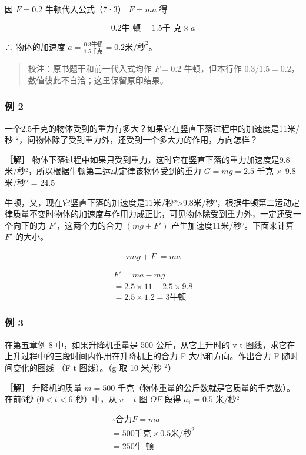 因 \(F = 0.2\) 牛顿代入公式（7·3） \(F=ma\) 得

\[
0.2 \text{牛 顿} = 1.5 \text{千 克} \times a
\]

∴ 物体的加速度
\(a=\frac{0.3\text{牛顿}}{1.5\text{千克}}=0.2\text{米/秒}^{2}\)。

\begin{quote}
校注：原书题干和前一代入式均作 \(F=0.2\) 牛顿，但本行作
\(0.3/1.5=0.2\)，数值彼此不自洽；这里保留原印结果。
\end{quote}

\subsubsection{例 2}\label{ux4f8b-2-7}

一个2.5千克的物体受到的重力有多大？如果它在竖直下落过程中的加速度是11米/秒
\(^{2}\)，问物体除了受到重力外，还受到一个多大力的作用，方向怎样？

\textbf{［解］}
物体下落过程中如果只受到重力，这时它在竖直下落的重力加速度是9.8米/秒²，所以根据牛顿第二运动定律该物体受到的重力
\(G = mg = 2.5\) 千克 × 9.8 米/秒² = 24.5

牛顿，又，现在它竖直下落的加速度是11米/秒²\textgreater9.8米/秒²，根据牛顿第二运动定律质量不变时物体的加速度与作用力成正比，可见物体除受到重力外，一定还受一个向下的力
\(F'\)，这两个力的合力 \((mg+F')\) 产生加速度11米/秒²。下面来计算 \(F'\)
的大小。

\[
\because m g + F ^ {\prime} = m a
\]

\[
\begin{array}{l} F'=ma-mg\\ =2.5\times11-2.5\times9.8\\ =2.5\times1.2=3\text{牛顿} \end{array}
\]

\subsubsection{例 3}\label{ux4f8b-3-5}

在第五章例 8 中，如果升降机重量是 500 公斤，从它上升时的 v-t
图线，求它在上升过程中的三段时间内作用在升降机上的合力 F
大小和方向。作出合力 F 随时间变化的图线 （F-t 图线）。（g 取 10 米/秒
\(^{2}\)）

\textbf{［解］} 升降机的质量 \(m = 500\)
千克（物体重量的公斤数就是它质量的千克数）。在前6秒 \((0 < t < 6\)
秒）中，从 \(v - t\) 图 \(OF\) 段得 \(a_{1} = 0.5\) 米/秒²

\[
\begin{array}{l} \therefore \text{合力} F = m a \\ = 500 \text{千克} \times 0.5 \text{米/秒} ^ {2} \\ = 250 \text{牛 顿} \\ \end{array}
\]

